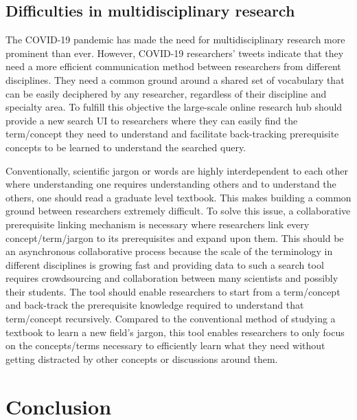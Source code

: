 \documentclass[acmsmall,authordraft]{acmart}
\begin{document}
\subsection{Difficulties in multidisciplinary research}
The COVID-19 pandemic has made the need for multidisciplinary research more prominent than ever. However, COVID-19 researchers’ tweets indicate that they need a more efficient communication method between researchers from different disciplines. They need a common ground around a shared set of vocabulary that can be easily deciphered by any researcher, regardless of their discipline and specialty area. To fulfill this objective the large-scale online research hub should provide a new search UI to researchers where they can easily find the term/concept they need to understand and facilitate back-tracking prerequisite concepts to be learned to understand the searched query.

Conventionally, scientific jargon or words are highly interdependent to each other where understanding one requires understanding others and to understand the others, one should read a graduate level textbook. This makes building a common ground between researchers extremely difficult. To solve this issue, a collaborative prerequisite linking mechanism is necessary where researchers link every concept/term/jargon to its prerequisites and expand upon them. This should be an asynchronous collaborative process because the scale of the terminology in different disciplines is growing fast and providing data to such a search tool requires crowdsourcing and collaboration between many scientists and possibly their students. The tool should enable researchers to start from a term/concept and back-track the prerequisite knowledge required to understand that term/concept recursively. Compared to the conventional method of studying a textbook to learn a new field’s jargon, this tool enables researchers to only focus on the concepts/terms necessary to efficiently learn what they need without getting distracted by other concepts or discussions around them.


\section{Conclusion}
\label{Conclusion}
\end{document}
